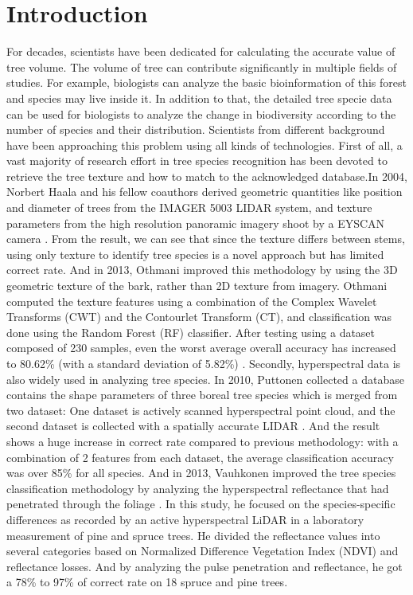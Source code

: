\documentclass[runningheads,a4paper]{llncs}
\begin{document}
\section{Introduction}
For decades, scientists have been dedicated for calculating the accurate value of tree volume. The volume of tree can contribute significantly in multiple fields of studies. For example, biologists can analyze the basic bioinformation of this forest and species may live inside it. In addition to that, the detailed tree specie data can be used for biologists to analyze the change in biodiversity according to the number of species and their distribution. Scientists from different background have been approaching this problem using all kinds of technologies.
First of all,  a vast majority of  research effort in tree species recognition has been devoted to retrieve the tree texture and how to match to the acknowledged database.In 2004, Norbert Haala and his fellow coauthors derived geometric quantities like position and diameter of trees from the IMAGER 5003 LIDAR system, and texture parameters from the high resolution panoramic imagery shoot by a EYSCAN camera \cite{1}.  From the result, we can see that since the texture differs between stems, using only texture to identify tree species is a novel approach but has limited correct rate.  And in 2013, Othmani improved this methodology by using the 3D geometric texture of the bark, rather than 2D texture from imagery. Othmani computed the texture features using a combination of the Complex Wavelet Transforms (CWT) and the Contourlet Transform (CT), and classification was done using the Random Forest (RF) classifier. 
After testing using a dataset composed of 230 samples, even the worst average overall accuracy has increased to 80.62\% (with a standard deviation of 5.82\%) \cite{2}.
Secondly, hyperspectral data is also widely used in analyzing tree species. In 2010, Puttonen collected a database contains the shape parameters of three boreal tree species which is merged from two dataset: One dataset is actively scanned hyperspectral point cloud, and the second dataset is collected with a spatially accurate LIDAR \cite{3}. And the result shows a huge increase in correct rate compared to previous methodology:  with a combination of 2 features from each dataset, the average classification accuracy was over 85\% for all species. And in 2013,  Vauhkonen improved the tree species classification methodology by analyzing the hyperspectral reflectance that had penetrated through the foliage \cite{4}. In this study, he focused on the species-specific differences as recorded by an active hyperspectral LiDAR in a laboratory measurement of pine and spruce trees. He divided the reflectance values into several categories based on Normalized Difference Vegetation Index (NDVI) and reflectance losses. And by analyzing the pulse penetration and reflectance, he got a 78\% to 97\% of correct rate on 18 spruce and pine trees.
\end{document}
